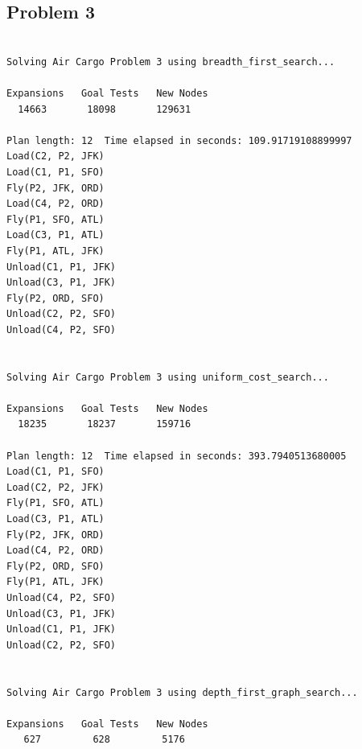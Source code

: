 \documentclass[10pt, a4paper,english]{article}
\begin{document}
\subsection{Problem 3}
\begin{lstlisting}

Solving Air Cargo Problem 3 using breadth_first_search...

Expansions   Goal Tests   New Nodes
  14663       18098       129631  

Plan length: 12  Time elapsed in seconds: 109.91719108899997
Load(C2, P2, JFK)
Load(C1, P1, SFO)
Fly(P2, JFK, ORD)
Load(C4, P2, ORD)
Fly(P1, SFO, ATL)
Load(C3, P1, ATL)
Fly(P1, ATL, JFK)
Unload(C1, P1, JFK)
Unload(C3, P1, JFK)
Fly(P2, ORD, SFO)
Unload(C2, P2, SFO)
Unload(C4, P2, SFO)


Solving Air Cargo Problem 3 using uniform_cost_search...

Expansions   Goal Tests   New Nodes
  18235       18237       159716  

Plan length: 12  Time elapsed in seconds: 393.7940513680005
Load(C1, P1, SFO)
Load(C2, P2, JFK)
Fly(P1, SFO, ATL)
Load(C3, P1, ATL)
Fly(P2, JFK, ORD)
Load(C4, P2, ORD)
Fly(P2, ORD, SFO)
Fly(P1, ATL, JFK)
Unload(C4, P2, SFO)
Unload(C3, P1, JFK)
Unload(C1, P1, JFK)
Unload(C2, P2, SFO)


Solving Air Cargo Problem 3 using depth_first_graph_search...

Expansions   Goal Tests   New Nodes
   627         628         5176   


\end{lstlisting}
\end{document}
